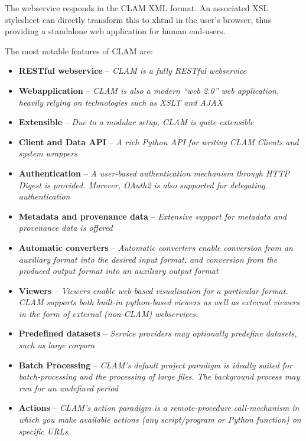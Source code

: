 \documentclass[a4paper,12pt,twoside,openright]{report}
\begin{document}
The webservice responds in the CLAM XML format. An associated XSL stylesheet
\citep{XSLT} can directly transform this to xhtml in the user's browser, thus
providing a standalone web application for human end-users. 

The most notable features of CLAM are: 

\begin{itemize}
\item \textbf{RESTful webservice} -- \emph{CLAM is a fully RESTful webservice}
\item \textbf{Webapplication} -- \emph{CLAM is also a modern ``web 2.0'' web application, heavily relying on technologies such as XSLT and AJAX}
\item \textbf{Extensible} -- \emph{Due to a modular setup, CLAM is quite extensible}
\item \textbf{Client and Data API} -- \emph{A rich Python API for writing CLAM Clients and system wrappers}
\item \textbf{Authentication} -- \emph{A user-based authentication mechanism
  through HTTP Digest is provided. Morever, OAuth2 is also supported for delegating
  authentication}
\item \textbf{Metadata and provenance data} -- \emph{Extensive support for metadata and provenance data is offered}
\item \textbf{Automatic converters} -- \emph{Automatic converters enable conversion from an auxiliary format into the desired input format, and conversion from the produced output format into an auxiliary output format}
\item \textbf{Viewers} -- \emph{Viewers enable web-based visualisation for a particular format. CLAM supports both built-in python-based viewers as well as external viewers in the form of external (non-CLAM) webservices.}
\item \textbf{Predefined datasets} -- \emph{Service providers may optionally predefine datasets, such as large corpora} 
\item \textbf{Batch Processing} -- \emph{CLAM's default project paradigm is ideally suited for
  batch-processing and the processing of large files. The background process
  may run for an undefined period}
\item \textbf{Actions} -- \emph{CLAM's action paradigm is a remote-procedure
  call-mechanism in which you make available actions (any script/program or Python
  function) on specific URLs}.
\end{itemize}
\end{document}
